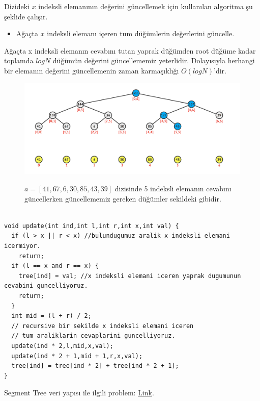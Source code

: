 \documentclass[12pt]{article}
\begin{document}
    Dizideki $x$ indeksli eleman{\i}n{\i}n de\u{g}erini g\"{u}ncellemek i\c{c}in kullan{\i}lan algoritma \c{s}u \c{s}eklide \c{c}al{\i}\c{s}{\i}r.
    
    \begin{itemize}
        \item A\u{g}a\c{c}ta $x$ indeksli eleman{\i} i\c{c}eren tum d\"{u}\u{g}\"umlerin de\u{g}erlerini g\"{u}ncelle.
    \end{itemize}
    
    A\u{g}a\c{c}ta x indeksli eleman{\i}n cevab{\i}n{\i} tutan yaprak d\"{u}\u{g}\"{u}mden root d\"{u}\u{g}\"{u}me kadar toplamda $logN$ d\"{u}\u{g}\"{u}m\"{u}n de\u{g}erini g\"{u}ncellememiz yeterlidir. Dolay{\i}s{\i}yla herhangi bir eleman{\i}n de\u{g}erini g\"{u}ncellemenin zaman karma\c{s}{\i}kl{\i}\u{g}{\i} $O(logN)$'dir.
    
	\begin{figure}[h]
		\centering
		\includegraphics[width=\linewidth/1]{segtreeupdate.png}
		\label{fig:segtreeupdate}
        \caption{$a = [41,67,6,30,85,43,39]$ dizisinde 5 indeksli eleman{\i}n cevab{\i}n{\i} g\"{u}ncellerken g\"{u}ncellememiz gereken d\"{u}\u{g}\"{u}mler sekildeki gibidir.}
	\end{figure}
    
    \begin{verbatim}

void update(int ind,int l,int r,int x,int val) {
  if (l > x || r < x) //bulundugumuz aralik x indeksli elemani icermiyor.
    return;
  if (l == x and r == x) {
    tree[ind] = val; //x indeksli elemani iceren yaprak dugumunun cevabini guncelliyoruz.
    return;
  }
  int mid = (l + r) / 2;
  // recursive bir sekilde x indeksli elemani iceren
  // tum araliklarin cevaplarini guncelliyoruz.
  update(ind * 2,l,mid,x,val);
  update(ind * 2 + 1,mid + 1,r,x,val);
  tree[ind] = tree[ind * 2] + tree[ind * 2 + 1];
}

    \end{verbatim}
    Segment Tree veri yap{\i}s{\i} ile ilgili problem: \href{https://codeforces.com/gym/100739/problem/A}{Link}.
    \cleardoublepage
    
\end{document}
